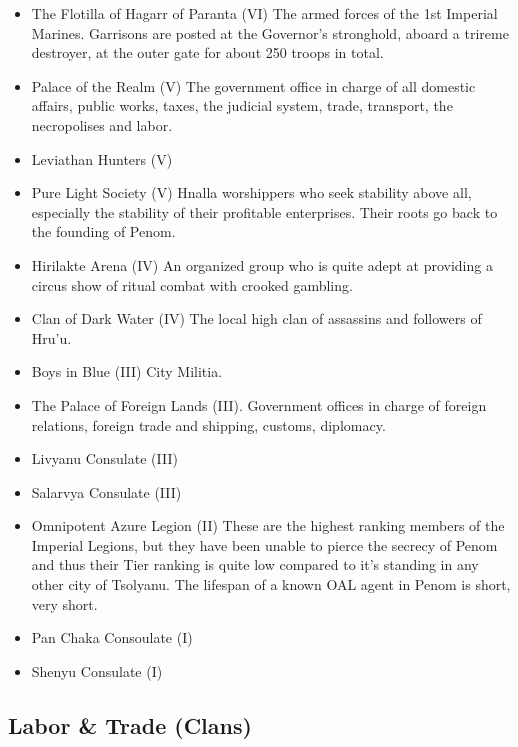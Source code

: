 \begin{itemize}
\item The Flotilla of Hagarr of Paranta (VI) The armed forces of the 1st Imperial Marines. Garrisons are posted at the Governor's stronghold, aboard a trireme destroyer, at the outer gate for about 250 troops in total.
\item Palace of the Realm (V) The government office in charge of all domestic affairs, public works, taxes, the judicial system, trade, transport, the necropolises and labor.
\item Leviathan Hunters (V)
\item Pure Light Society (V) Hnalla worshippers who seek stability above all, especially the stability of their profitable enterprises. Their roots go back to the founding of Penom. 
\item Hirilakte Arena (IV) An organized group who is quite adept at providing a circus show of ritual combat with crooked gambling.
\item Clan of Dark Water (IV) The local high clan of assassins and followers of Hru'u.
\item Boys in Blue (III) City Militia. 
\item The Palace of Foreign Lands (III). Government offices in charge of foreign relations, foreign trade and shipping, customs, diplomacy.
\item Livyanu Consulate (III)
\item Salarvya Consulate (III)
\item Omnipotent Azure Legion (II) These are the highest ranking members of the Imperial Legions, but they have been unable to pierce the secrecy of Penom and thus their Tier ranking is quite low compared to it's standing in any other city of Tsolyanu. The lifespan of a known OAL agent in Penom is short, very short. 
\item Pan Chaka Consoulate (I)
\item Shenyu Consulate (I)
\end{itemize}

\subsection{Labor \& Trade (Clans)}

